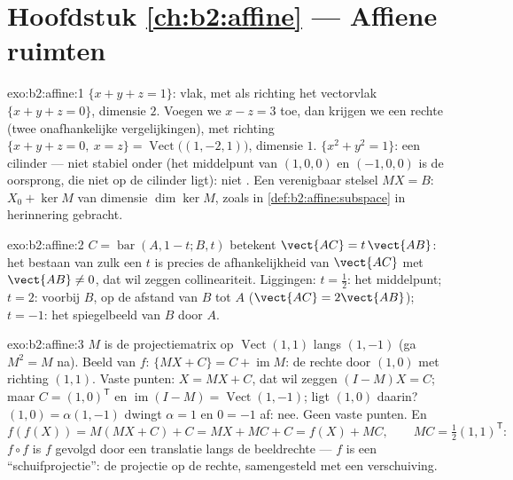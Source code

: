 \section*{Hoofdstuk \ref{ch:b2:affine} --- Affiene ruimten}

\begin{solution}{exo:b2:affine:1}
$\{x + y + z = 1\}$:  vlak, met als richting het vectorvlak
$\{x + y + z = 0\}$, dimensie $2$. Voegen we $x - z = 3$ toe, dan
krijgen we een  rechte (twee onafhankelijke vergelijkingen),
met richting $\{x + y + z = 0,\ x = z\} =
\operatorname{Vect}\bigl((1, -2, 1)\bigr)$, dimensie $1$. $\{x^2 +
y^2 = 1\}$: een cilinder --- niet stabiel onder  (het
middelpunt van $(1,0,0)$ en $(-1,0,0)$ is de oorsprong, die niet op
de cilinder ligt): niet . Een verenigbaar stelsel $MX = B$:
 $X_0 + \ker M$ van dimensie $\dim\ker M$, zoals
in \cref{def:b2:affine:subspace} in herinnering gebracht.
\end{solution}

\begin{solution}{exo:b2:affine:2}
$C = \operatorname{bar}(A, 1-t; B, t)$ betekent $\vect{AC} =
t\,\vect{AB}$: het bestaan van zulk een $t$ is precies de
afhankelijkheid van $\vect{AC}$ met $\vect{AB} \neq 0$, dat wil
zeggen collineariteit. Liggingen: $t = \frac12$: het middelpunt; $t
= 2$: voorbij $B$, op de afstand van $B$ tot $A$ ($\vect{AC} =
2\vect{AB}$); $t = -1$: het spiegelbeeld van $B$ door $A$.
\end{solution}

\begin{solution}{exo:b2:affine:3}
$M$ is de projectiematrix op $\operatorname{Vect}(1,1)$ langs
$(1,-1)$ (ga $M^2 = M$ na). Beeld van $f$: $\{MX + C\} = C +
\operatorname{im} M$: de  rechte door $(1,0)$ met richting
$(1,1)$. Vaste punten: $X = MX + C$, dat wil zeggen $(I - M)X = C$;
maar $C = (1, 0)^{\mathsf T}$ en $\operatorname{im}(I - M) =
\operatorname{Vect}(1,-1)$; ligt $(1,0)$ daarin? $(1, 0) =
\alpha(1,-1)$ dwingt $\alpha = 1$ en $0 = -1$ af: nee. Geen vaste
punten. En
\[
f(f(X)) = M(MX + C) + C = MX + MC + C = f(X) + MC,
\qquad MC = \tfrac12(1,1)^{\mathsf T} :
\]
$f\circ f$ is $f$ gevolgd door een translatie langs de beeldrechte
--- $f$ is een ``schuifprojectie'': de projectie op de rechte,
samengesteld met een verschuiving.
\end{solution}

